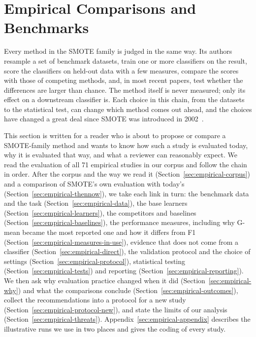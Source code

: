 \section{Empirical Comparisons and Benchmarks}
\label{sec:empirical}

Every method in the SMOTE family is judged in the same way. Its authors resample a set of benchmark datasets, train one or more classifiers on the result, score the classifiers on held-out data with a few measures, compare the scores with those of competing methods, and, in most recent papers, test whether the differences are larger than chance. The method itself is never measured; only its effect on a downstream classifier is. Each choice in this chain, from the datasets to the statistical test, can change which method comes out ahead, and the choices have changed a great deal since SMOTE was introduced in 2002~\parencite{chawla2002smote}.

This section is written for a reader who is about to propose or compare a SMOTE-family method and wants to know how such a study is evaluated today, why it is evaluated that way, and what a reviewer can reasonably expect. We read the evaluation of all 71 empirical studies in our corpus and follow the chain in order. After the corpus and the way we read it (Section~\ref{sec:empirical-corpus}) and a comparison of SMOTE's own evaluation with today's (Section~\ref{sec:empirical-thennow}), we take each link in turn: the benchmark data and the task (Section~\ref{sec:empirical-data}), the base learners (Section~\ref{sec:empirical-learners}), the competitors and baselines (Section~\ref{sec:empirical-baselines}), the performance measures, including why G-mean became the most reported one and how it differs from F1 (Section~\ref{sec:empirical-measures-in-use}), evidence that does not come from a classifier (Section~\ref{sec:empirical-direct}), the validation protocol and the choice of settings (Section~\ref{sec:empirical-protocol}), statistical testing (Section~\ref{sec:empirical-tests}) and reporting (Section~\ref{sec:empirical-reporting}). We then ask why evaluation practice changed when it did (Section~\ref{sec:empirical-why}) and what the comparisons conclude (Section~\ref{sec:empirical-outcomes}), collect the recommendations into a protocol for a new study (Section~\ref{sec:empirical-protocol-new}), and state the limits of our analysis (Section~\ref{sec:empirical-threats}). Appendix~\ref{sec:empirical-appendix} describes the illustrative runs we use in two places and gives the coding of every study.

